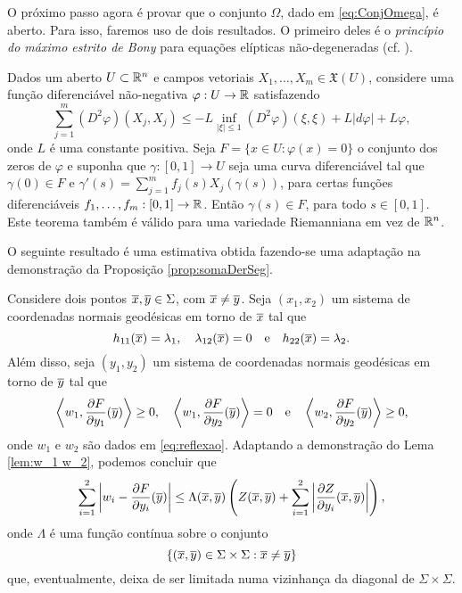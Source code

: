 O pr\'oximo passo agora \'e provar que o conjunto $\Omega$,
dado em \eqref{eq:ConjOmega}, \'e aberto. Para isso, faremos
uso de dois resultados. O primeiro deles \'e o {\em princ\'ipio
do m\'aximo estrito de Bony} para equa\c c\~oes el\'ipticas 
n\~ao-degeneradas (cf. \cite[Corollary 9.7]{Brendle2010}).

\begin{teorema} \label{teo:bony}
Dados um aberto $U\subset\mathbb{R}^n$ e campos vetoriais 
$X_1,\ldots,X_m\in\mathfrak{X}(U)$, considere uma fun\c c\~ao
diferenci\'avel n\~ao-negativa $\varphi:U\to\mathbb{R}$ satisfazendo
\begin{equation}\label{eq:bony}
\sum_{j=1}^{m} (D^2 \varphi)(X_j,X_j) \leq -L \inf_{|\xi| \leq 1} 
(D^2 \varphi)(\xi,\xi) + L |d \varphi| + L \varphi,
\end{equation}
onde $L$ é uma constante positiva. Seja $F=\{x\in U:\varphi(x)=0\}$
o conjunto dos zeros de $\varphi$ e suponha que $\gamma:[0,1]\to U$
seja uma curva diferenciável tal que $\gamma(0)\in F$ e 
$\gamma'(s) = \displaystyle\sum_{j=1}^{m} f_j(s) X_j(\gamma(s))$, para certas
funções diferenciáveis $f_1,\ldots,f_m:[0,1]\to\mathbb{R}$. Então 
$\gamma(s)\in F$, para todo $s\in[0,1]$.
Este teorema também é válido para uma variedade Riemanniana em vez de $\mathbb{R}^n$.
\end{teorema}

O seguinte resultado \'e uma estimativa obtida fazendo-se uma
adapta\c c\~ao na demonstra\c c\~ao da Proposi\c c\~ao
\ref{prop:somaDerSeg}.

Considere dois pontos $\overline{x},\overline{y}\in\Sigma$, com $\overline{x}\neq\overline{y}$. Seja
$(x_1,x_2)$ um sistema de coordenadas normais geod\'esicas em
torno de $\overline{x}$ tal que
\[
h_{11}(\overline{x})=\lambda_1, \quad \lambda_{12}(\overline{x})=0
\quad\mbox{e}\quad h_{22}(\overline{x})=\lambda_2. 
\]
Al\'em disso, seja $(y_1,y_2)$ um sistema de coordenadas normais 
geod\'esicas em torno de $\overline{y}$ tal que
\begin{equation*}
\left\langle w_1, \frac{\partial F}{\partial y_1}(\overline{y}) \right\rangle \geq 0, 
\quad 
\left\langle w_1, \frac{\partial F}{\partial y_2}(\overline{y}) \right\rangle = 0 
\quad \text{e} \quad 
\left\langle w_2, \frac{\partial F}{\partial y_2}(\overline{y}) \right\rangle \geq 0,
\end{equation*}
onde $w_1$ e $w_2$ s\~ao dados em \eqref{eq:reflexao}. Adaptando
a demonstra\c c\~ao do Lema \ref{lem:w_1 w_2}, podemos concluir
que
\begin{equation}\label{eq:Gamma-ineq}
	\sum_{i=1}^2\left| w_i-\frac{\partial F}{\partial y_i}(\overline{y})\right| \leq
	\Lambda(\overline{x},\overline{y})\left(Z(\overline{x},\overline{y})+\sum_{i=1}^2
	\left|\frac{\partial Z}{\partial y_i}(\overline{x},\overline{y})\right|\right),
\end{equation}
onde $\Lambda$ \'e uma fun\c c\~ao cont\'inua sobre o conjunto
\[
\{(\overline{x},\overline{y})\in\Sigma\times\Sigma:\overline{x}\neq\overline{y}\}
\]
que, eventualmente, deixa de ser limitada numa vizinhan\c ca
da diagonal de $\Sigma\times\Sigma$. 


